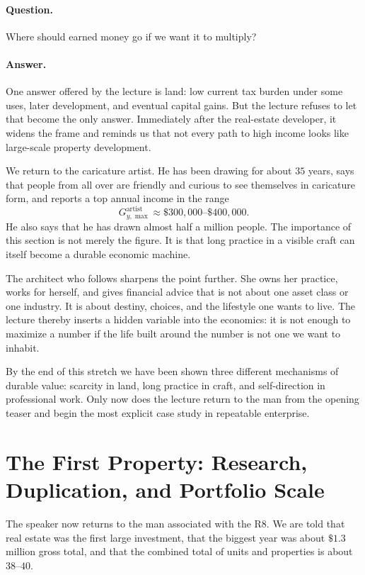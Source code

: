 \paragraph{Question.}
Where should earned money go if we want it to multiply?

\paragraph{Answer.}
One answer offered by the lecture is land: low current tax burden under some uses, later development, and eventual capital gains. But the lecture refuses to let that become the only answer. Immediately after the real-estate developer, it widens the frame and reminds us that not every path to high income looks like large-scale property development.

We return to the caricature artist. He has been drawing for about \(35\) years, says that people from all over are friendly and curious to see themselves in caricature form, and reports a top annual income in the range
\begin{equation}
G_{y,\max}^{\mathrm{artist}} \approx \$300{,}000\text{--}\$400{,}000.
\end{equation}
He also says that he has drawn almost half a million people. The importance of this section is not merely the figure. It is that long practice in a visible craft can itself become a durable economic machine.

The architect who follows sharpens the point further. She owns her practice, works for herself, and gives financial advice that is not about one asset class or one industry. It is about destiny, choices, and the lifestyle one wants to live. The lecture thereby inserts a hidden variable into the economics: it is not enough to maximize a number if the life built around the number is not one we want to inhabit.

By the end of this stretch we have been shown three different mechanisms of durable value: scarcity in land, long practice in craft, and self-direction in professional work. Only now does the lecture return to the man from the opening teaser and begin the most explicit case study in repeatable enterprise.

\section{The First Property: Research, Duplication, and Portfolio Scale}

The speaker now returns to the man associated with the R8. We are told that real estate was the first large investment, that the biggest year was about \(\$1.3\) million gross total, and that the combined total of units and properties is about \(38\text{--}40\).

